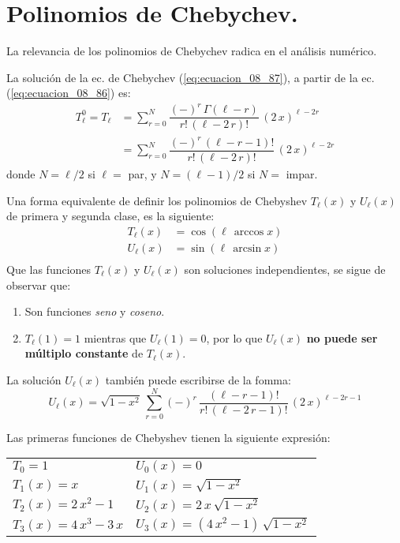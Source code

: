  \section{Polinomios de Chebychev.}
La relevancia de los polinomios de Chebychev radica en el análisis numérico.
\par
La solución de la ec. de Chebychev (\ref{eq:ecuacion_08_87}), a partir de la ec. (\ref{eq:ecuacion_08_86}) es:
\begin{align*}
T_{\ell}^{0} = T_{\ell} &= \sum_{r=0}^{N} \dfrac{(-)^{r} \, \Gamma (\ell - r)}{r! \, (\ell - 2 \, r)!} \, (2 \, x)^{\ell - 2r} \\
&= \sum_{r=0}^{N} \dfrac{(-)^{r} \, (\ell - r - 1)!}{r! \, (\ell - 2 \, r)!} \, (2 \, x)^{\ell - 2r}
\end{align*}
donde $N=\ell/2$ si $\ell=$ par, y $N=(\ell-1)/2$ si $N=$ impar.
\par
Una forma equivalente de definir los polinomios de Chebyshev $T_{\ell} (x)$ y $U_{\ell} (x)$ de primera y segunda clase, es la siguiente:
\begin{align*}
T_{\ell} (x) &= \cos (\ell \, \arccos x) \\
U_{\ell} (x) &= \sin (\ell \, \arcsin x) \\
\end{align*}
Que las funciones $T_{\ell} (x)$ y $U_{\ell} (x)$ son soluciones independientes, se sigue de observar que:
\begin{enumerate}[label=\alph*)]
\item Son funciones \emph{seno} y \emph{coseno}.
\item $T_{\ell}(1) = 1$ mientras que $U_{\ell}(1) = 0$, por lo que $U_{\ell}(x)$ \textbf{no puede ser múltiplo constante} de $T_{\ell}(x)$.
\end{enumerate}
La solución $U_{\ell}(x)$ también puede escribirse de la fomma:
\[ U_{\ell} (x) = \sqrt{1 - x^{2}} \, \sum_{r=0}^{N} (-)^{r} \, \dfrac{(\ell - r - 1)!}{r! \, (\ell -2 \, r - 1)!} \, (2 \, x)^{\ell-2r-1} \]
\par
Las primeras funciones de Chebyshev tienen la siguiente expresión:
\begin{table}[H]
\centering
\begin{tabular}{>{\raggedright\arraybackslash}p{5cm} >{\raggedright\arraybackslash}p{5cm}}
$T_{0}=1$ & $U_{0}(x)=0$  \\
$T_{1}(x) = x$ & $U_{1}(x) = \sqrt{1 - x^{2}}$ \\
$T_{2}(x) = 2 \, x^{2} - 1$ & $U_{2}(x) = 2 \, x \, \sqrt{1 - x^{2}}$ \\
$T_{3}(x) = 4 \, x^{3} - 3 \, x$ & $U_{3}(x) = (4 \, x^{2} - 1) \, \sqrt{1 - x^{2}}$ \\ 
\end{tabular}
\end{table}
